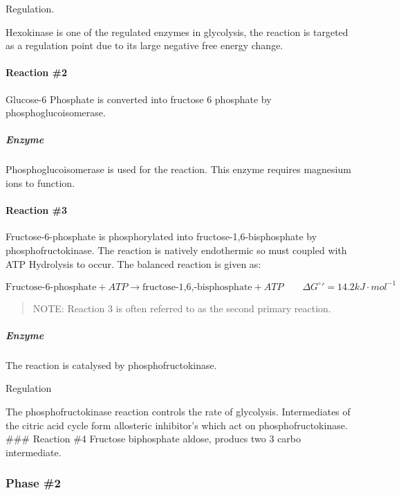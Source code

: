 \documentclass[]{article}
\let\oldparagraph\paragraph
\renewcommand{\paragraph}[1]{\oldparagraph{#1}\mbox{}}
\let\oldsubparagraph\subparagraph
\renewcommand{\subparagraph}[1]{\oldsubparagraph{#1}\mbox{}}
\begin{document}
Regulation.

Hexokinase is one of the regulated enzymes in glycolysis, the reaction
is targeted as a regulation point due to its large negative free energy
change.

\hypertarget{reaction-2}{%
\paragraph{Reaction \#2}\label{reaction-2}}

Glucose-6 Phosphate is converted into fructose 6 phosphate by
phosphoglucoisomerase.

\hypertarget{enzyme}{%
\subparagraph{Enzyme}\label{enzyme}}

Phosphoglucoisomerase is used for the reaction. This enzyme requires
magnesium ions to function.

\hypertarget{reaction-3}{%
\paragraph{Reaction \#3}\label{reaction-3}}

Fructose-6-phosphate is phosphorylated into fructose-1,6-bisphosphate by
phosphofructokinase. The reaction is natively endothermic so must
coupled with ATP Hydrolysis to occur. The balanced reaction is given
as:\newline

\(\text{Fructose-6-phosphate}+ATP\rightarrow \text{fructose-1,6,-bisphosphate}+ ATP \quad\quad \Delta G^\circ \prime=14.2kJ\cdot mol^{-1}\)

\begin{quote}
NOTE: Reaction 3 is often referred to as the second primary reaction.
\end{quote}

\hypertarget{enzyme-1}{%
\subparagraph{Enzyme}\label{enzyme-1}}

The reaction is catalysed by phosphofructokinase.

Regulation

The phosphofructokinase reaction controls the rate of glycolysis.
Intermediates of the citric acid cycle form allosteric inhibitor's which
act on phosphofructokinase. \#\#\# Reaction \#4 Fructose biphosphate
aldose, producs two 3 carbo intermediate.

\hypertarget{phase-2}{%
\subsubsection{Phase \#2}\label{phase-2}}
\end{document}
